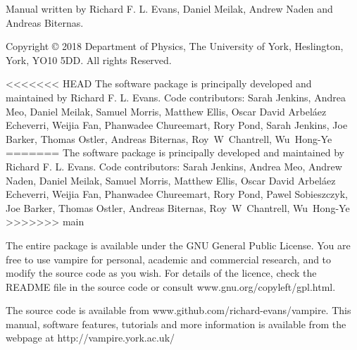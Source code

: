\noindent Manual written by Richard F. L. Evans, Daniel Meilak, Andrew Naden and Andreas Biternas.\\
\par
\noindent Copyright \copyright \xspace 2018 Department of Physics, The University of York, Heslington, York, YO10 5DD. All rights Reserved.\\
\par
<<<<<<< HEAD
\noindent The \vampire software package is principally developed and maintained by Richard F. L. Evans. Code contributors: Sarah Jenkins, Andrea Meo, Daniel Meilak, Samuel Morris, Matthew Ellis, Oscar David Arbel\'aez Echeverri, Weijia Fan, Phanwadee Chureemart, Rory Pond, Sarah Jenkins, Joe Barker, Thomas Ostler, Andreas Biternas, Roy~W~Chantrell, Wu~Hong-Ye\\
=======
\noindent The \vampire software package is principally developed and maintained by Richard F. L. Evans. Code contributors: Sarah Jenkins, Andrea Meo, Andrew Naden, Daniel Meilak, Samuel Morris, Matthew Ellis, Oscar David Arbel\'aez Echeverri, Weijia Fan, Phanwadee Chureemart, Rory Pond, Pawel Sobieszczyk, Joe Barker, Thomas Ostler, Andreas Biternas, Roy~W~Chantrell, Wu~Hong-Ye\\
>>>>>>> main
\par
\noindent The entire \vampire package is available under the GNU General Public License. You are free to use vampire for personal, academic and commercial research, and to modify the source code as you wish. For details of the licence, check the README file in the source code or consult www.gnu.org/copyleft/gpl.html.\\
\par
\noindent The \vampire source code is available from www.github.com/richard-evans/vampire. This manual, software features, tutorials and more information is available from the \vampire webpage at http://vampire.york.ac.uk/\\
